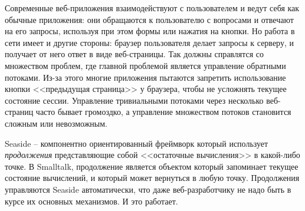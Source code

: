 \documentclass[a4paper,10pt,twoside]{book}
\begin{document}

Современные веб-приложения взаимодействуют с пользователем и ведут себя как обычные приложения:
они обращаются к пользователю с вопросами и отвечают на его запросы, используя при этом формы или нажатия на кнопки.
Но работа в сети имеет и другие стороны: браузер пользователя делает запросы к серверу, и получает от него ответ в виде веб-страницы.
Так  должны справлятся со множеством проблем,
где главной проблемой является управление обратными потоками.
Из-за этого многие приложения пытаются запретить использование кнопки <<предыдущая страница>> у браузера,
чтобы не усложнять текущее состояние сессии.
Управление тривиальными потоками через несколько веб-страниц часто бывает громоздко,
а управление множеством потоков становится сложным или невозможным.


Seaside -- компонентно ориентированный фреймворк который использует
\emph{продолжения} представляющие собой <<остаточные вычисления>> в какой-либо точке.
В Smalltalk, продолжение является объектом который запоминает текущее состояние вычислений,
и который может вернуться в любую точку. Продолжения управляются Seaside автоматически,
что даже веб-разработчику не надо быть в курсе их основных механизмов. И это работает.
\end{document}
